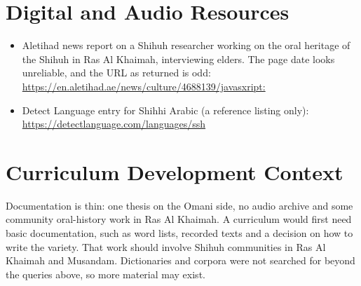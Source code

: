 \documentclass[12pt]{article}
\begin{document}
\section{Digital and Audio Resources}
\begin{itemize}
\item Aletihad news report on a Shihuh researcher working on the oral heritage of the Shihuh in Ras Al Khaimah, interviewing elders. The page date looks unreliable, and the URL as returned is odd: \url{https://en.aletihad.ae/news/culture/4688139/javasxript:}
\item Detect Language entry for Shihhi Arabic (a reference listing only): \url{https://detectlanguage.com/languages/ssh}
\end{itemize}

\section{Curriculum Development Context}
Documentation is thin: one thesis on the Omani side, no audio archive and some community oral-history work in Ras Al Khaimah. A curriculum would first need basic documentation, such as word lists, recorded texts and a decision on how to write the variety. That work should involve Shihuh communities in Ras Al Khaimah and Musandam. Dictionaries and corpora were not searched for beyond the queries above, so more material may exist.
\end{document}
